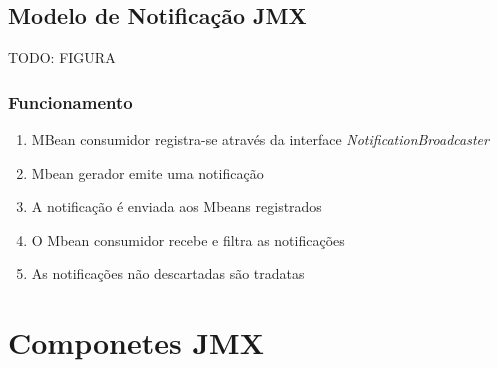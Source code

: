 \subsection{Modelo de Notificação JMX}

TODO: FIGURA

\subsubsection{Funcionamento} 
\begin{enumerate}
\item MBean consumidor registra-se através da interface \textit{NotificationBroadcaster}

\item Mbean gerador emite uma notificação

\item A notificação é enviada aos Mbeans registrados

\item O Mbean consumidor recebe e filtra as notificações

\item As notificações não descartadas são tradatas
\end{enumerate}

\section{Componetes JMX}
